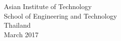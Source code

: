 \begin{center}
  \singlespace Asian Institute of Technology\\ School of Engineering
                  and Technology\\ Thailand\\ March 2017
\end{center}
\vfill
\begin{comment}

-------------------To be uncommented when writing final thesis

\newpage
\pagestyle{plain}
\addcontentsline{toc}{section}{Acknowledgments}
\onecolumn %
\if@twoside\else\raggedbottom\fi %
\setlength{\footskip}{8mm}
\begin{center}
{
  \large \bf Acknowledgments\\ \vskip 1em
}
\vskip 1em
\end{center}
\singlespace
\doublespace
\hspace{8.5mm}
\vspace{-1em}

I would like to thank all my family members for showing great support towards my dream of pursuing a Master’s degree. 
I also thank my Professors Dr. Vatcharaporn Esichaikul and Dr Matthew N. Dailey for guiding me in my academics and for helping me understand the concepts. 
\\
\\
Lastly I also humbly thank the staff of my Institution for their support and assistance in my  academic pursuit.
Above all I am grateful to the ominipresent spirit of the universe which guides me in achieving the milestones I imagined.


\newpage
\pagestyle{plain}
\addcontentsline{toc}{section}{Abstract}
\onecolumn %
\if@twoside\else\raggedbottom\fi %

\setlength{\footskip}{8mm}

\begin{center}
{\large \bf Abstract \\ \vskip 1em}
\vskip 1em
\end{center}
\singlespace
\doublespace
\hspace{8.5mm}
\vspace{-1em}

The telecom industry is very competitive. There is a huge customer base and they number of players are less. Hence occasional offers from competition results in loss of customer and a drop in revenue. The phenomenon is termed churning and it may occur in any service  industry. 
\\Thus this thesis is to control churning by modeling a system which is capable of identifying the customers. It also proposes decisions which could be taken to retain these customers.

\end{comment}
\setlength{\parskip}{0pt} 




